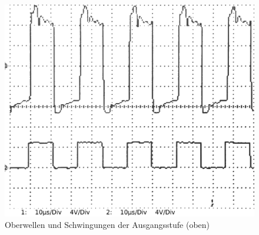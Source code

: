 \begin{figure}[H]
\centering
\includegraphics[width=(\textwidth), angle=0]{oszi/15-04-01/4.png}
\caption{Oberwellen und Schwingungen der Ausgangsstufe (oben)} \label{img:I7}
\end{figure}

